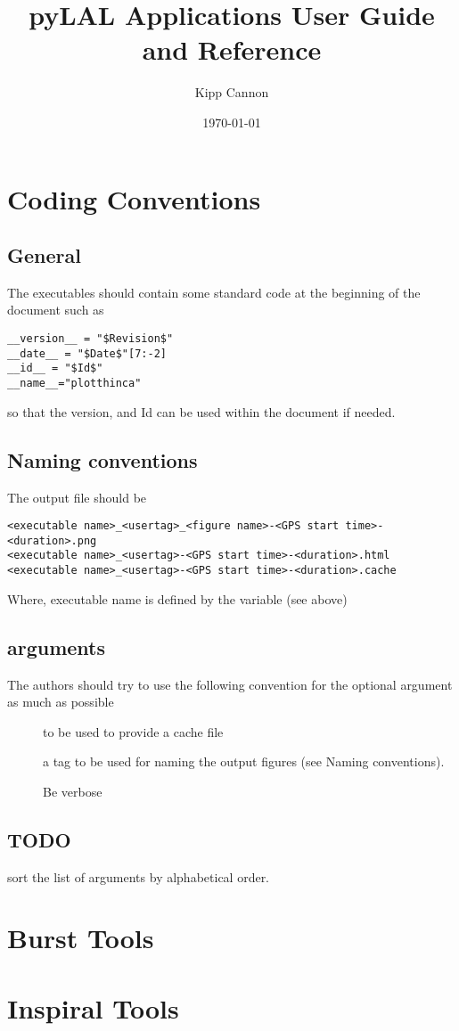 \documentclass{book}
\title{pyLAL Applications User Guide and Reference}
\author{Kipp Cannon}
\date{\today}
\begin{document}
\maketitle
\tableofcontents
\listoftables
\listoffigures
\chapter{Coding Conventions}
\section{General}
The executables should contain some standard code at the beginning of the document such
as
\begin{verbatim}
__version__ = "$Revision$"
__date__ = "$Date$"[7:-2]
__id__ = "$Id$"
__name__="plotthinca"
\end{verbatim}
so that the version, and Id can be used within the document if needed.

\section{Naming conventions}
The output file should be 
\begin{verbatim}
<executable name>_<usertag>_<figure name>-<GPS start time>-<duration>.png
<executable name>_<usertag>-<GPS start time>-<duration>.html
<executable name>_<usertag>-<GPS start time>-<duration>.cache
\end{verbatim}
Where, executable name is defined by the variable  (see above)


\section{arguments}
The authors should try to use the following convention for the optional
argument as much as possible
\begin{description}
\item[] to be used to provide a cache file
\item[] a tag to be used for naming the output figures
(see Naming conventions).
\item[] Be verbose
\end{description}

\section{TODO}
sort the list of arguments by alphabetical order.



\chapter{Burst Tools}

\chapter{Inspiral Tools}

\end{document}
